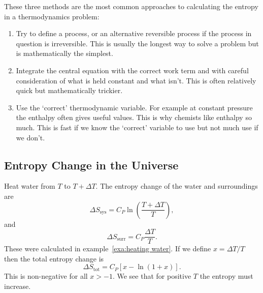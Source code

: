 \documentclass[a4paper]{article}
\newcommand{\sys}{{\mathrm{sys}}}
\newcommand{\surr}{{\mathrm{surr}}}
\newcommand{\tot}{{\mathrm{tot}}}
\begin{document}
    These three methods are the most common approaches to calculating the entropy in a thermodynamics problem:
    \begin{enumerate}
        \item Try to define a process, or an alternative reversible process if the process in question is irreversible.
        This is usually the longest way to solve a problem but is mathematically the simplest.
        \item Integrate the central equation with the correct work term and with careful consideration of what is held constant and what isn't.
        This is often relatively quick but mathematically trickier.
        \item Use the `correct' thermodynamic variable.
        For example at constant pressure the enthalpy often gives useful values.
        This is why chemists like enthalpy so much.
        This is fast if we know the `correct' variable to use but not much use if we don't.
    \end{enumerate}
    
    \subsection{Entropy Change in the Universe}
    Heat water from \(T\) to \(T + \Delta T\).
    The entropy change of the water and surroundings are
    \[\Delta S_\sys = C_P \ln\left(\frac{T + \Delta T}{T}\right),\]
    and
    \[\Delta S_\surr = C_P\frac{\Delta T}{T}.\]
    These were calculated in example~\ref{exa:heating water}.
    If we define \(x = \Delta T/T\) then the total entropy change is
    \[\Delta S_\tot = C_P[x - \ln(1 + x)].\]
    This is non-negative for all \(x > -1\).
    We see that for positive \(T\) the entropy must increase.
    
\end{document}
